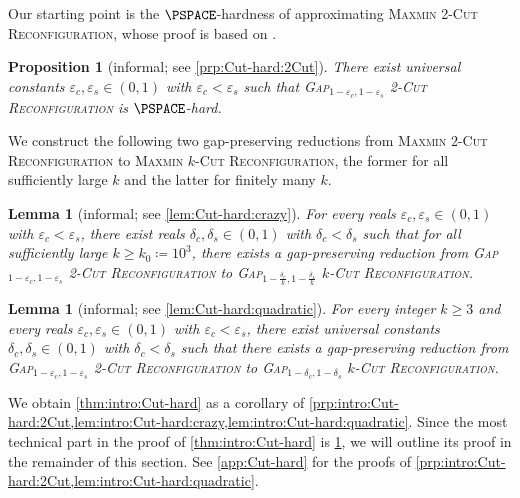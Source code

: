 \documentclass[11pt,fleqn]{article}
\renewcommand{\geq}{\geqslant}
\renewcommand{\epsilon}{\varepsilon}
\newcommand{\prb}[1]{\textsc{#1}\xspace}
\newcommand{\defeq}{\coloneq}
\newcommand{\kzero}{10^3}
\newcommand{\kCutReconf}{\prb{$k$-Cut Reconfiguration}}
\newcommand{\MMkCutReconf}{\prb{Maxmin $k$-Cut Reconfiguration}}
\newcommand{\twoCutReconf}{\prb{2-Cut Reconfiguration}}
\newcommand{\MMtwoCutReconf}{\prb{Maxmin 2-Cut Reconfiguration}}
\newtheorem{proposition}[theorem]{Proposition}
\newtheorem{lemma}[theorem]{Lemma}
\theoremstyle{definition}
\numberwithin{equation}{section}
\begin{document}
Our starting point is the $\PSPACE$-hardness of approximating \MMtwoCutReconf,
whose proof is based on \cite{bonsma2009finding,hirahara2024probabilistically,ohsaka2023gap}.


\begin{proposition}[informal; see \cref{prp:Cut-hard:2Cut}]
\label{prp:intro:Cut-hard:2Cut}
There exist universal constants $\epsilon_c,\epsilon_s \in (0,1)$ with $\epsilon_c < \epsilon_s$ such that
\prb{Gap$_{1-\epsilon_c,1-\epsilon_s}$ \twoCutReconf}
is $\PSPACE$-hard.
\end{proposition}

\noindent
We construct the following two gap-preserving reductions from \MMtwoCutReconf to \MMkCutReconf,
the former for all sufficiently large $k$ and
the latter for finitely many $k$.


\begin{lemma}[informal; see \cref{lem:Cut-hard:crazy}]
\label{lem:intro:Cut-hard:crazy}
    For every reals $\epsilon_c,\epsilon_s \in (0,1)$ with $\epsilon_c < \epsilon_s$,
    there exist reals $\delta_c, \delta_s \in (0,1)$ with $\delta_c < \delta_s$
    such that
    for all sufficiently large $k \geq k_0 \defeq \kzero$,
    there exists a gap-preserving reduction from
    \prb{Gap$_{1-\epsilon_c,1-\epsilon_s}$ \twoCutReconf}
    to
    \prb{Gap$_{1-\frac{\delta_c}{k},1-\frac{\delta_s}{k}}$ \kCutReconf}.
\end{lemma}


\begin{lemma}[informal; see \cref{lem:Cut-hard:quadratic}]
\label{lem:intro:Cut-hard:quadratic}
    For every integer $k \geq 3$ and
    every reals $\epsilon_c,\epsilon_s \in (0,1)$ with $\epsilon_c < \epsilon_s$,
    there exist universal constants $\delta_c,\delta_s \in (0,1)$ with $\delta_c<\delta_s$ such that
    there exists a gap-preserving reduction from
    \prb{Gap$_{1-\epsilon_c, 1-\epsilon_s}$ \twoCutReconf}
    to
    \prb{Gap$_{1-\delta_c, 1-\delta_s}$ \kCutReconf}.
\end{lemma}

\noindent
We obtain \cref{thm:intro:Cut-hard} as a corollary of 
\cref{prp:intro:Cut-hard:2Cut,lem:intro:Cut-hard:crazy,lem:intro:Cut-hard:quadratic}.
Since the most technical part in the proof of \cref{thm:intro:Cut-hard} is \cref{lem:intro:Cut-hard:crazy},
we will outline its proof in the remainder of this section.
See \cref{app:Cut-hard} for
the proofs of \cref{prp:intro:Cut-hard:2Cut,lem:intro:Cut-hard:quadratic}.
\end{document}
